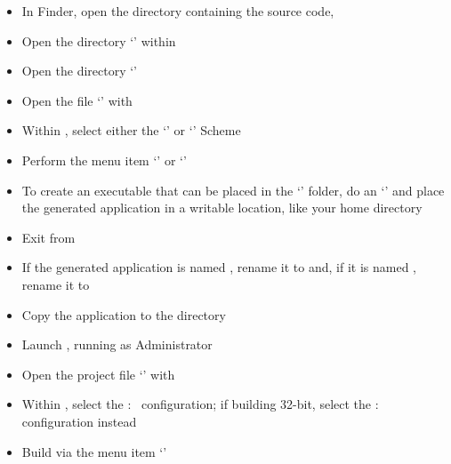 \begin{itemize}
\item In Finder, open the directory containing the \mplusm{} source code,
\item\exSp{}Open the directory `' within
\item\exSp{}Open the directory `'
\item\exSp{}Open the file `' with 
\item\exSp{}Within , select either the `' or
`' Scheme
\item\exSp{}Perform the menu item `' or
`'
\item\exSp{}To create an executable that can be placed in the `'
folder, do an `'
and place the generated application in a writable location, like your home directory
\item\exSp{}Exit from 
\item\exSp{}If the generated application is named , rename
it to  and, if it is named ,
rename it to 
\item\exSp{}Copy the  application to the 
directory
\end{itemize}
\tertiaryEnd
{}
\begin{itemize}
\item Launch , running as Administrator
\item\exSp{}Open the project file
`' with
\item\exSp{}Within , select the  :\ 
configuration; if building 32-bit, select the  :\ 
configuration instead
\item\exSp{}Build via the menu item `'
\end{itemize}
\tertiaryEnd
{}
